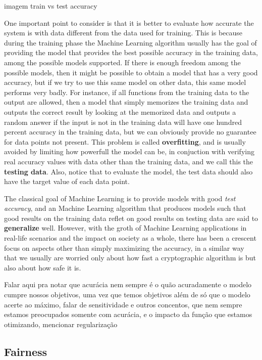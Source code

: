 {\color{red} imagem train vs test accuracy}

One important point to consider is that it is better to evaluate how accurate the system is with data different from the data used for training. This is because during the training phase the Machine Learning algorithm usually has the goal of providing the model that provides the best possible accuracy in the training data, among the possible models supported. If there is enough freedom among the possible models, then it might be possible to obtain a model that has a very good accuracy, but if we try to use this same model on other data, this same model performs very badly. For instance, if all functions from the training data to the output are allowed, then a model that simply memorizes the training data and outputs the correct result by looking at the memorized data and outputs a random answer if the input is not in the training data will have one hundred percent accuracy in the training data, but we can obviously provide no guarantee for data points not present. This problem is called \textbf{overfitting}, and is usually avoided by limiting how powerfull the model can be, in conjuction with verifying real accuracy values with data other than the training data, and we call this the \textbf{testing data}. Also, notice that to evaluate the model, the test data should also have the target value of each data point.

The classical goal of Machine Learning is to provide models with good \emph{test accuracy}, and an Machine Learning algorithm that produces models such that good results on the training data reflet on good results on testing data are said to \textbf{generalize} well. However, with the groth of Machine Learning applications in real-life scenarios and the impact on society as a whole, there has been a crescent focus on aspects other than simply maximizing the accuracy, in a similar way that we usually are worried only about how fast a cryptographic algorithm is but also about how safe it is.

{\color{red} Falar aqui pra notar que acurácia nem sempre é o quão acuradamente o modelo cumpre nossos objetivos, uma vez que temos objetivos além de só que o modelo acerte ao máximo, falar de sensitividade e outros concentos, que nem sempre estamos preocupados somente com acurácia, e o impacto da função que estamos otimizando, mencionar regularização}

\subsection{Fairness}

